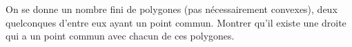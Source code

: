 On se donne un nombre fini de polygones (pas nécessairement convexes), deux quelconques d'entre eux ayant un point commun. Montrer qu'il existe une droite qui a un point commun avec chacun de ces polygones.
